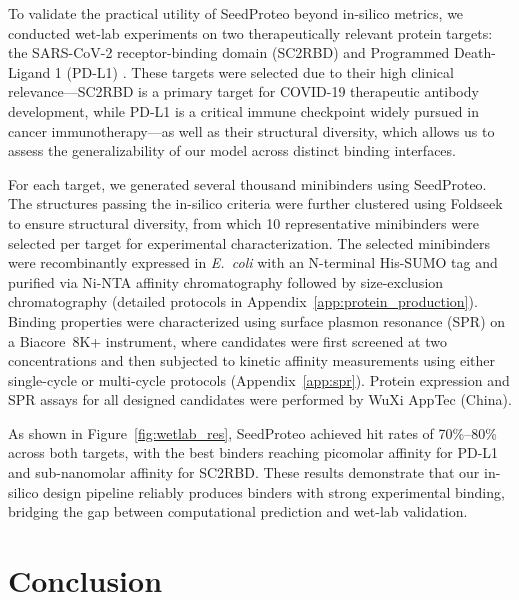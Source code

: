 \documentclass[]{bytedance_seed}
\begin{document}
To validate the practical utility of SeedProteo beyond in-silico metrics, we conducted wet-lab experiments on two therapeutically relevant protein targets: the SARS-CoV-2 receptor-binding domain (SC2RBD) \cite{cao2020novo} and Programmed Death-Ligand 1 (PD-L1) \cite{yang2025design}. These targets were selected due to their high clinical relevance---SC2RBD is a primary target for COVID-19 therapeutic antibody development, while PD-L1 is a critical immune checkpoint widely pursued in cancer immunotherapy---as well as their structural diversity, which allows us to assess the generalizability of our model across distinct binding interfaces.

For each target, we generated several thousand minibinders using SeedProteo. The structures passing the in-silico criteria were further clustered using Foldseek to ensure structural diversity, from which 10 representative minibinders were selected per target for experimental characterization. The selected minibinders were recombinantly expressed in \textit{E.~coli} with an N-terminal His-SUMO tag and purified via Ni-NTA affinity chromatography followed by size-exclusion chromatography (detailed protocols in Appendix~\ref{app:protein_production}). Binding properties were characterized using surface plasmon resonance (SPR) on a Biacore~8K+ instrument, where candidates were first screened at two concentrations and then subjected to kinetic affinity measurements using either single-cycle or multi-cycle protocols (Appendix~\ref{app:spr}). Protein expression and SPR assays for all designed candidates were performed by WuXi AppTec (China).

As shown in Figure~\ref{fig:wetlab_res}, SeedProteo achieved hit rates of 70\%--80\% across both targets, with the best binders reaching picomolar affinity for PD-L1 and sub-nanomolar affinity for SC2RBD. These results demonstrate that our in-silico design pipeline reliably produces binders with strong experimental binding, bridging the gap between computational prediction and wet-lab validation.



\section{Conclusion}
\end{document}
